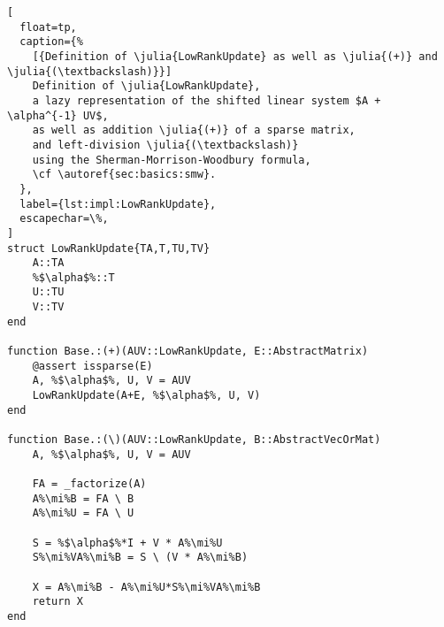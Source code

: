 \def\mi{\textsuperscript{-1}}
\begin{lstlisting}[
  float=tp,
  caption={%
    [{Definition of \julia{LowRankUpdate} as well as \julia{(+)} and \julia{(\textbackslash)}}]
    Definition of \julia{LowRankUpdate},
    a lazy representation of the shifted linear system $A + \alpha^{-1} UV$,
    as well as addition \julia{(+)} of a sparse matrix,
    and left-division \julia{(\textbackslash)}
    using the Sherman-Morrison-Woodbury formula,
    \cf \autoref{sec:basics:smw}.
  },
  label={lst:impl:LowRankUpdate},
  escapechar=\%,
]
struct LowRankUpdate{TA,T,TU,TV}
    A::TA
    %$\alpha$%::T
    U::TU
    V::TV
end

function Base.:(+)(AUV::LowRankUpdate, E::AbstractMatrix)
    @assert issparse(E)
    A, %$\alpha$%, U, V = AUV
    LowRankUpdate(A+E, %$\alpha$%, U, V)
end

function Base.:(\)(AUV::LowRankUpdate, B::AbstractVecOrMat)
    A, %$\alpha$%, U, V = AUV

    FA = _factorize(A)
    A%\mi%B = FA \ B
    A%\mi%U = FA \ U

    S = %$\alpha$%*I + V * A%\mi%U
    S%\mi%VA%\mi%B = S \ (V * A%\mi%B)

    X = A%\mi%B - A%\mi%U*S%\mi%VA%\mi%B
    return X
end
\end{lstlisting}

